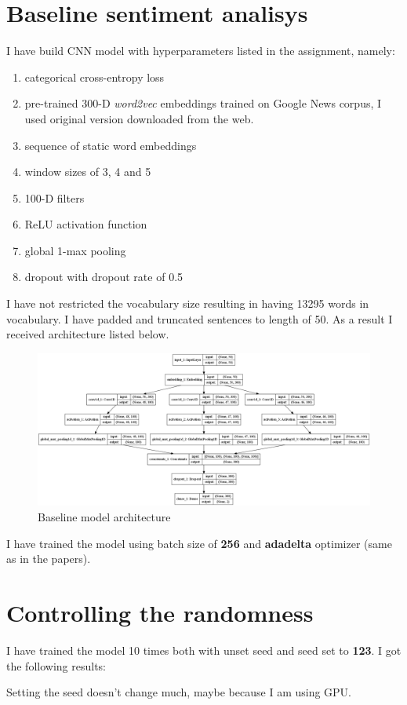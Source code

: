 \documentclass{article}
\begin{document}
\section{Baseline sentiment analisys}
I have build CNN model with hyperparameters listed in the assignment, namely:
\begin{enumerate}
    \item categorical cross-entropy loss
    \item pre-trained 300-D \textit{word2vec} embeddings trained on Google News corpus,
    I used original version downloaded from the web.
    \item sequence of static word embeddings
    \item window sizes of 3, 4 and 5
    \item 100-D filters
    \item ReLU activation function
    \item global 1-max pooling
    \item dropout with dropout rate of 0.5
\end{enumerate}
I have not restricted the vocabulary size resulting in having 13295 words in vocabulary.
I have padded and truncated sentences to length of 50. As a result I received architecture listed below.
\newpage
\begin{figure}[h]
    \centering
    \includegraphics[width=1\textwidth]{../figures/baseline.png}
    \caption{Baseline model architecture}
\end{figure}
I have trained the model using batch size of \textbf{256} and \textbf{adadelta} optimizer 
(same as in the papers).
\section{Controlling the randomness}
I have trained the model 10 times both with unset seed and seed set to \textbf{123}. I got
the following results:
\begin{figure}[h]
    \centering
    
\end{figure}
Setting the seed doesn't change much, maybe because I am using GPU.
\end{document}
